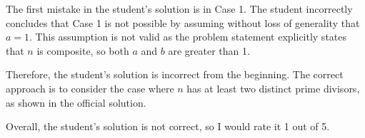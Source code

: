 The first mistake in the student's solution is in Case 1. The student incorrectly concludes that Case 1 is not possible by assuming without loss of generality that \(a = 1\). This assumption is not valid as the problem statement explicitly states that \(n\) is composite, so both \(a\) and \(b\) are greater than 1.

Therefore, the student's solution is incorrect from the beginning. The correct approach is to consider the case where \(n\) has at least two distinct prime divisors, as shown in the official solution. 

Overall, the student's solution is not correct, so I would rate it 1 out of 5.
